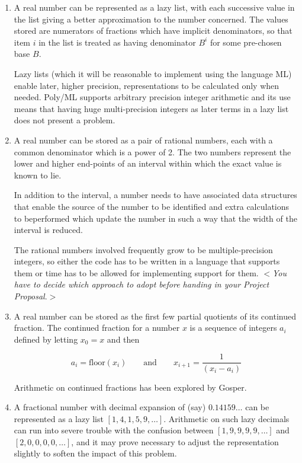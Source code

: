 \documentclass[12pt]{article}
\newcommand{\al}{$<$}
\newcommand{\ar}{$>$}
\begin{document}
\begin{enumerate}

\item A real number can be represented as a lazy list, with each
  successive value in the list giving a better approximation to the
  number concerned. The values stored are numerators of fractions
  which have implicit denominators, so that item $i$ in the list is
  treated as having denominator $B^{i}$ for some pre-chosen base
  $B$\null.

Lazy lists (which it will be reasonable to implement using the
language ML) enable later, higher precision, representations to be
calculated only when needed.  Poly/ML supports arbitrary precision
integer arithmetic and its use means that having huge multi-precision
integers as later terms in a lazy list does not present a problem.

\item A real number can be stored as a pair of rational numbers, each
  with a common denominator which is a power of 2. The two numbers
  represent the lower and higher end-points of an interval within
  which the exact value is known to lie.

In addition to the interval, a number needs to have associated data
structures that enable the source of the number to be identified and
extra calculations to be\break performed which update the number in such a
way that the width of the interval is reduced.

The rational numbers involved frequently grow to be multiple-precision
integers, so either the code has to be written in a language that
supports them or time has to be allowed for implementing support for
them.  \al\emph{You have to decide which approach to adopt before
  handing in your Project Proposal}.\ar

\item A real number can be stored as the first few partial quotients
  of its continued fraction.  The continued fraction for a number $x$
  is a sequence of integers $a_i$ defined by letting $x_0 = x$ and
  then

\[
a_i = \mbox{floor}(x_i)\qquad \mbox{and}\qquad
x_{i+1} = \frac{1}{(x_i - a_i)}
\]

Arithmetic on continued fractions has been explored by Gosper.

\item A fractional number with decimal expansion of (say)
$0.14159\ldots$ can be represented as a lazy list $[1, 4, 1, 5,
9,\ldots]$.  Arithmetic on such lazy decimals can run into severe
trouble with the confusion between $[1, 9, 9, 9, 9,\ldots]$ and $[2,
0, 0, 0, 0,\ldots]$, and it may prove necessary to adjust the
representation slightly to soften the impact of this problem.


\end{enumerate}
\end{document}

